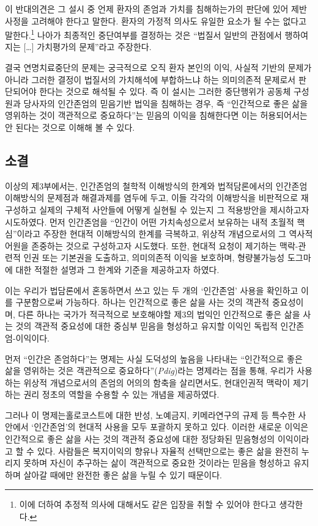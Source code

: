 이 반대의견은 그 설시 중 언제 환자의 존엄과 가치를 침해하는가의 판단에 있어 제반사정을 고려해야 한다고 말한다. 환자의 가정적 의사도 유일한 요소가 될 수는 없다고 말한다.\footnote{이에 더하여 추정적 의사에 대해서도 같은 입장을 취할 수 있어야 한다고 생각한다.} 나아가 최종적인 중단여부를 결정하는 것은 ``법질서 일반의 관점에서 행하여지는 {[}\ldots{]} 가치평가의 문제''라고 주장한다.

결국 연명치료중단의 문제는 궁극적으로 오직 환자 본인의 이익, 사실적 기반의 문제가 아니라 그러한 결정이 법질서의 가치해석에 부합하느냐 하는 의미의존적 문제로서 판단되어야 한다는 것으로 해석될 수 있다. 즉 이 설시는 그러한 중단행위가 공동체 구성원과 당사자의 인간존엄의 믿음기반 법익을 침해하는 경우, 즉 ``인간적으로 좋은 삶을 영위하는 것이 객관적으로 중요하다''는 믿음의 이익을 침해한다면 이는 허용되어서는 안 된다는 것으로 이해해 볼 수 있다.

\subsection{소결}

이상의 제3부에서는, 인간존엄의 철학적 이해방식의 한계와 법적담론에서의 인간존엄 이해방식의 문제점과 해결과제를 염두에 두고, 이들 각각의 이해방식을 비판적으로 재구성하고 실제의 구체적 사안들에 어떻게 실현될 수 있는지 그 적용방안을 제시하고자 시도하였다. 먼저 인간존엄을 ``인간이 어떤 가치속성으로서 보유하는 내적 초월적 핵심''이라고 주장한 현대적 이해방식의 한계를 극복하고, 위상적 개념으로서의 그 역사적 어원을 존중하는 것으로 구성하고자 시도했다. 또한, 현대적 요청이 제기하는 맥락-관련적 인권 또는 기본권을 도출하고, 의미의존적 이익을 보호하며, 형량불가능성 도그마에 대한 적절한 설명과 그 한계와 기준을 제공하고자 하였다.

이는 우리가 법담론에서 혼동하면서 쓰고 있는 두 개의 `인간존엄' 사용을 확인하고 이를 구분함으로써 가능하다. 하나는 인간적으로 좋은 삶을 사는 것의 객관적 중요성이며, 다른 하나는 국가가 적극적으로 보호해야할 제3의 법익인 인간적으로 좋은 삶을 사는 것의 객관적 중요성에 대한 중심부 믿음을 형성하고 유지할 이익인 독립적 인간존엄-이익이다.

먼저 ``인간은 존엄하다''는 명제는 사실 도덕성의 높음을 나타내는 ``인간적으로 좋은 삶을 영위하는 것은 객관적으로 중요하다''(\emph{Pdig})라는 명제라는 점을 통해, 우리가 사용하는 위상적 개념으로서의 존엄의 어의의 함축을 살리면서도, 현대인권적 맥락이 제기하는 권리 정초의 역할을 수용할 수 있는 개념을 제공하였다.

그러나 이 명제는홀로코스트에 대한 반성, 노예금지, 키메라연구의 규제 등 특수한 사안에서 `인간존엄'의 현대적 사용을 모두 포괄하지 못하고 있다. 이러한 새로운 이익은 인간적으로 좋은 삶을 사는 것의 객관적 중요성에 대한 정당화된 믿음형성의 이익이라고 할 수 있다. 사람들은 복지이익의 향유나 자율적 선택만으로는 좋은 삶을 완전히 누리지 못하며 자신이 추구하는 삶이 객관적으로 중요한 것이라는 믿음을 형성하고 유지하며 살아갈 때에만 완전한 좋은 삶을 누릴 수 있기 때문이다.


